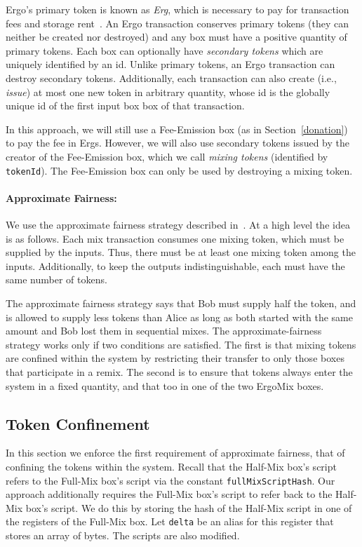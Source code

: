 \documentclass[runningheads]{llncs}
\newcommand{\mixname}{ErgoMix\xspace}
\begin{document}
Ergo's primary token is known as {\em Erg}, which is necessary to pay for transaction fees and storage rent~\cite{chepurnoy2018systematic}. An Ergo transaction conserves primary tokens (they can neither be created nor destroyed) and any box must have a positive quantity of primary tokens.
Each box can optionally have {\em secondary tokens} which are uniquely identified by an id. Unlike primary tokens, an Ergo transaction can destroy secondary tokens. Additionally, each transaction can also create (i.e., {\em issue}) at most one new token in arbitrary quantity, whose id is the globally unique id of the first input box box of that transaction. 

In this approach, we will still use a Fee-Emission box (as in Section~\ref{donation}) to pay the fee in Ergs. However, we will also use secondary tokens issued by the creator of the Fee-Emission box, which we call {\em mixing tokens} (identified by \texttt{tokenId}). The Fee-Emission box can only be used by destroying a mixing token.

\paragraph{Approximate Fairness:} We use the approximate fairness strategy described in~\cite{advtutorial}. At a high level the idea is as follows.
Each mix transaction consumes one mixing token, which must be supplied by the inputs. Thus, there must be at least one mixing token among the inputs. Additionally, to keep the outputs indistinguishable, each must have the same number of tokens. 

The approximate fairness strategy says that Bob must supply half the token, and is allowed to supply less tokens than Alice as long as both started with the same amount and Bob lost them in sequential mixes.
The approximate-fairness strategy works only if two conditions are satisfied. The first is that mixing tokens are confined within the system by restricting their transfer to only those boxes that participate in a remix. 
The second is to ensure that tokens always enter the system in a fixed quantity, and that too in one of the two \mixname boxes. 

\subsection{Token Confinement}

In this section we enforce the first requirement of approximate fairness, that of confining the tokens within the system. 
Recall that the Half-Mix box's script refers to the Full-Mix box's script via the constant \texttt{fullMixScriptHash}. Our approach additionally requires the Full-Mix box's script to refer back to the Half-Mix box's script. We do this by storing the hash of the Half-Mix script in one of the registers of the Full-Mix box. Let \texttt{delta} be an alias for this register that stores an array of bytes. The scripts are also modified.
\end{document}
